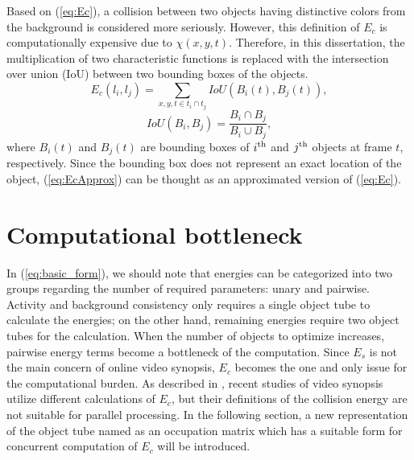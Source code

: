 \documentclass[11pt]{hyu_thesis}
\begin{document}
Based on (\ref{eq:Ec}), a collision between two objects having distinctive colors from the background is considered more seriously. However, this definition of $E_c$ is computationally expensive due to $\chi(x,y,t)$. Therefore, in this dissertation, the multiplication of two characteristic functions is replaced with the intersection over union (IoU) between two bounding boxes of the objects.
\begin{equation}
\label{eq:EcApprox}
E_c(l_i,l_j)=\sum_{x,y,t \in t_i \cap t_j} IoU \left( B_i(t),B_j(t) \right),
\end{equation}
\begin{equation}
IoU(B_i,B_j)=\frac{B_i \cap B_j}{B_i \cup B_j},
\end{equation}
where $B_i(t)$ and $B_j(t)$ are bounding boxes of $i^{\rm{th}}$ and $j^{\rm{th}}$ objects at frame $t$, respectively. Since the bounding box does not represent an exact location of the object, (\ref{eq:EcApprox}) can be thought as an approximated version of (\ref{eq:Ec}).

\section{Computational bottleneck}
In (\ref{eq:basic_form}), we should note that energies can be categorized into two groups regarding the number of required parameters: unary and pairwise. Activity and background consistency only requires a single object tube to calculate the energies; on the other hand, remaining energies require two object tubes for the calculation. When the number of objects to optimize increases, pairwise energy terms become a bottleneck of the computation. Since $E_s$ is not the main concern of online video synopsis, $E_c$ becomes the one and only issue for the computational burden. As described in , recent studies of video synopsis~\cite{He2017} utilize different calculations of $E_c$, but their definitions of the collision energy are not suitable for parallel processing. In the following section, a new representation of the object tube named as an occupation matrix which has a suitable form for concurrent computation of $E_c$ will be introduced.
\end{document}
